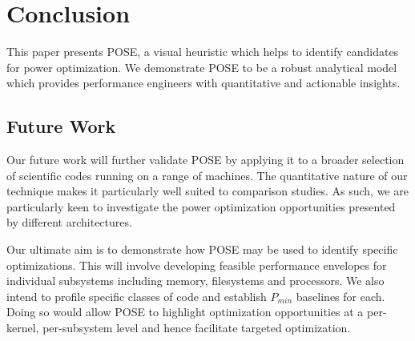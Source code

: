 \section{Conclusion}
\label{sec:conclusion}
This paper presents POSE, a visual heuristic which helps to identify candidates for power optimization.
We demonstrate POSE to be a robust analytical model which provides performance engineers with quantitative and actionable insights.

\subsection{Future Work}
Our future work will further validate POSE by applying it to a broader selection of scientific codes running on a range of machines.
The quantitative nature of our technique makes it particularly well suited to comparison studies.
As such, we are particularly keen to investigate the power optimization opportunities presented by different architectures.

Our ultimate aim is to demonstrate how POSE may be used to identify specific optimizations.
This will involve developing feasible performance envelopes for individual subsystems including memory, filesystems and processors. 
We also intend to profile specific classes of code and establish $P_{min}$ baselines for each.
Doing so would allow POSE to highlight optimization opportunities at a per-kernel, per-subsystem level and hence facilitate targeted optimization.
